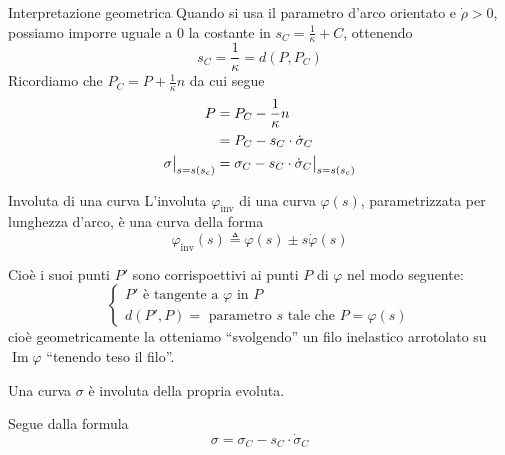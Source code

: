 \documentclass[a4paper]{article}
\begin{document}
\pagebreak

\begin{snippetnote}{Interpretazione geometrica}
    Quando si usa il parametro d'arco orientato e \(\dot\rho>0\), possiamo imporre uguale a \(0\) la costante
    in \(s_C = \frac1\kappa + C\), ottenendo
    \[
        s_C = \frac1\kappa = d(P, P_C)
    \]
    Ricordiamo che \(P_C = P + \frac{1}{\kappa}n\) da cui segue
    \begin{align*}
         P &= P_C - \frac{1}{\kappa}n \\
         &= P_C - s_C \cdot \dot\sigma_C \\
         \restr{\sigma}{s=s(s_c)} &= \restr{\sigma_C - s_C \cdot \dot\sigma_C}{s=s(s_c)}
    \end{align*}
\end{snippetnote}

\begin{snippetdefinition}{Involuta di una curva}
    L'involuta \(\varphi_{\text{inv}}\) di una curva \(\varphi(s)\), parametrizzata per lunghezza d'arco,
    è una curva della forma 
    \[
        \varphi_{\text{inv}}(s) \triangleq \varphi(s) \pm s \dot \varphi(s)
    \]
\end{snippetdefinition}

Cioè i suoi punti \(P'\) sono corrispoettivi ai punti
\(P\) di \(\varphi\) nel modo seguente:
\[
    \begin{cases}
        P' \text{ è tangente a } \varphi \text{ in } P \\
        d(P', P) = \text{ parametro } s \text{ tale che } P = \varphi(s)
    \end{cases}
\]
cioè geometricamente la otteniamo ``svolgendo'' un filo inelastico arrotolato su
\(\operatorname{Im}\varphi\) ``tenendo teso il filo''.

\begin{snippetcorollary}{}
    Una curva \(\sigma\) è involuta della propria evoluta.
\end{snippetcorollary}

\begin{snippetproof}{}
    Segue dalla formula
    \[
        \sigma = \sigma_C - s_C \cdot \dot \sigma_C
    \]
\end{snippetproof}

\pagebreak
\end{document}
